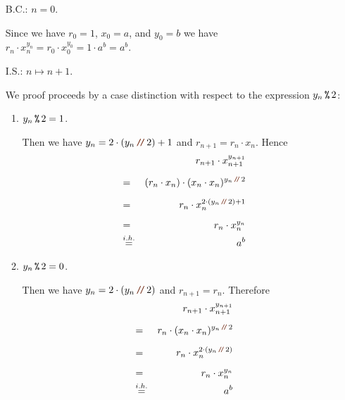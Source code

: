 \begin{enumerate}
\item[B.C.:] $n=0$.

            Since we have $r_0 = 1$, $x_0 = a$, and $y_0 = b$ we have 
            \\[0.2cm]
            \hspace*{1.3cm}
            $r_n \cdot x_n^{y_n} = r_0 \cdot x_0^{y_0} = 1 \cdot a^{b} = a^b$.
\item[I.S.:] $n \mapsto n + 1$.

            We proof proceeds by a case distinction with respect to the expression $y_n \,\texttt{\%}\, 2$:
            \begin{enumerate}
            \item $y_n \,\texttt{\%}\, 2 = 1$.

                  Then we have $y_{n} = 2 \cdot (y_n\dv 2) + 1$ and
                  $r_{n+1} = r_n \cdot x_n$.  Hence
                  \begin{eqnarray*}
                      &   & r_{n+1} \cdot x_{n+1}^{y_{n+1}} \\[0.2cm] 
                      & = & (r_{n} \cdot x_n) \cdot (x_{n} \cdot x_{n})^{y_{n}\dvv 2} \\[0.2cm] 
                      & = & r_{n} \cdot x_n^{2 \cdot (y_{n}\dvv 2) + 1} \\[0.2cm] 
                      & = & r_{n} \cdot x_n^{y_n} \\
                      & \stackrel{i.h.}{=} & a^{b} 
                  \end{eqnarray*}

            \item $y_n \,\texttt{\%}\, 2 = 0$.

                  Then we have $y_{n} = 2 \cdot (y_n\dv 2)$ and $r_{n+1} = r_n$.
                  Therefore
                  \begin{eqnarray*}
                      &   & r_{n+1} \cdot x_{n+1}^{y_{n+1}} \\[0.2cm] 
                      & = & r_{n} \cdot (x_{n} \cdot x_{n})^{y_{n}\dvv 2} \\[0.2cm] 
                      & = & r_{n} \cdot x_n^{2 \cdot (y_{n} \dvv 2)} \\[0.2cm] 
                      & = & r_{n} \cdot x_n^{y_n} \\
                      & \stackrel{i.h.}{=} & a^{b} 
                  \end{eqnarray*}
            \end{enumerate}
\end{enumerate}
